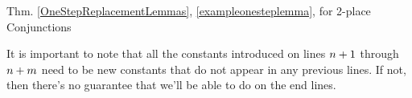 \begin{PROOFOF}{Thm. \ref{OneStepReplacementLemmas}, \ref{exampleonesteplemma}, for 2-place Conjunctions}
\begin{gproofnn}
\gline{$\integer{q}+14$}{$\forall[{\parconjunction{\CAPPHI}{\CAPPSI}}\TRIPLEBAR$}{ }
\glinend{}{$\qquad{\parconjunction{\CAPPHI^*}{\CAPPSI}]\constant{c_{\integer{1}}}\ldots\constant{c_{\integer{\integer{m}-1}}}/\variable{x}_1\ldots\variable{x}_{\integer{m}-1}}$}{\Rule{$\forall$-Intro}, $\integer{q}+13$}

\glinend{ }{$\qquad\vdots$}{ }


\end{gproofnn}
\noindent{}It is important to note that all the constants introduced on lines $n+1$ through $n+m$ need to be new constants that do not appear in any previous lines. 
If not, then there's no guarantee that we'll be able to do  on the end lines. 
\end{PROOFOF}

